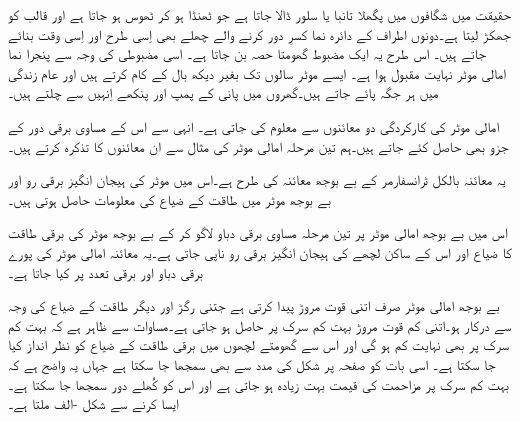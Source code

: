حقیقت میں شگافوں میں پگھلا تانبا یا سلور  ڈالا جاتا ہے جو ٹھنڈا ہو کر ٹھوس ہو جاتا ہے اور قالب کو جھکڑ لیتا ہے۔دونوں اطراف کے دائرہ نما کسرِ دور کرنے والے چھلے بھی اِسی طرح اور اِسی وقت بنائے جاتے ہیں۔  اس طرح یہ ایک مضبوط گھومتا حصہ بن جاتا ہے۔ اسی مضبوطی کی وجہ سے  پنجرا نما امالی موٹر نہایت مقبول ہوا ہے۔ ایسے موٹر سالوں تک بغیر دیکھ بال کے کام کرتے ہیں اور عام زندگی میں ہر جگہ پائے جاتے ہیں۔گھروں میں پانی کے پمپ اور پنکھے اِنہیں سے چلتے ہیں۔

امالی موٹر کی کارکردگی دو معائنوں سے معلوم کی جاتی ہے۔ انہی سے اس کے مساوی برقی دور کے جزو بھی حاصل کئے جاتے ہیں۔ہم تین مرحلہ امالی موٹر کی مثال سے ان معائنوں کا تذکرہ کرتے ہیں۔

یہ معائنہ بالکل ٹرانسفارمر کے بے بوجھ معائنہ کی طرح ہے۔اس میں موٹر کی ہیجان انگیز برقی رو اور بے بوجھ موٹر میں طاقت کے ضیاع کی معلومات حاصل ہوتی ہیں۔ 

اس میں  بے بوجھ امالی موٹر پر تین مرحلہ مساوی برقی دباو  لاگو کر کے بے بوجھ موٹر کی برقی طاقت کا ضیاع  اور اس کے ساکن لچھے  کی ہیجان انگیز برقی رو  ناپی جاتی ہے۔یہ معائنہ امالی موٹر کی پورے برقی دباو اور برقی تعدد پر کیا جاتا ہے۔

بے بوجھ امالی موٹر صرف اتنی قوت مروڑ پیدا کرتی ہے جتنی رگڑ اور دیگر طاقت کے ضیاع کی وجہ سے درکار ہو۔اتنی کم قوت مروڑ بہت کم سرک پر حاصل ہو جاتی ہے۔مساوات   سے ظاہر ہے کہ بہت کم سرک پر   بھی نہایت کم ہو گی  اور اس سے گھومتے لچھوں میں برقی طاقت کے ضیاع کو نظر انداز کیا جا سکتا ہے۔ اسی بات کو صفحہ  پر شکل   کی مدد سے بھی سمجھا جا سکتا ہے جہاں یہ واضح ہے کہ بہت کم سرک پر مزاحمت  کی قیمت بہت زیادہ ہو جاتی ہے اور اس کو کُھلے دور سمجھا جا سکتا ہے۔ایسا کرنے سے شکل -الف ملتا ہے۔

